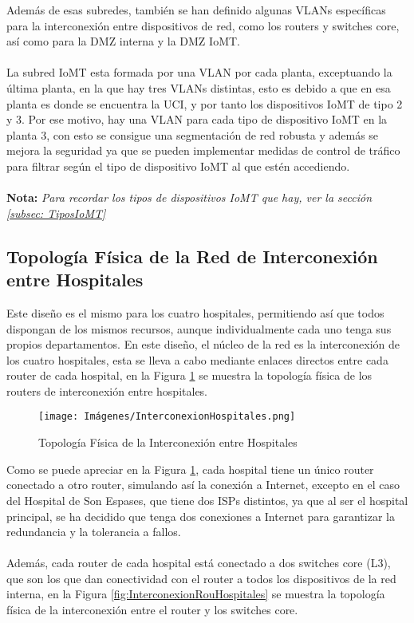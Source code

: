 Además de esas subredes, también se han definido algunas VLANs específicas para la interconexión entre dispositivos de red, como los routers y switches core, así como para la DMZ interna y la DMZ IoMT.
\\ \\
La subred IoMT esta formada por una VLAN por cada planta, exceptuando la última planta, en la que hay tres VLANs distintas, esto es debido a que en esa planta es donde se encuentra la UCI, y por tanto los dispositivos IoMT de tipo 2 y 3.
Por ese motivo, hay una VLAN para cada tipo de dispositivo IoMT en la planta 3, con esto se consigue una segmentación de red robusta y además se mejora la seguridad ya que se pueden implementar medidas de control de tráfico para filtrar según el tipo de dispositivo IoMT al que estén accediendo.
\\ \\
{\small \textbf{Nota:} \textit{Para recordar los tipos de dispositivos IoMT que hay, ver la sección \ref{subsec: TiposIoMT}}}


\subsection{Topología Física de la Red de Interconexión entre Hospitales}
Este diseño es el mismo para los cuatro hospitales, permitiendo así que todos dispongan de los mismos recursos, aunque individualmente cada uno tenga sus propios departamentos.
En este diseño, el núcleo de la red es la interconexión de los cuatro hospitales, esta se lleva a cabo mediante enlaces directos entre cada router de cada hospital, en la Figura \ref{fig:InterconexionHospitales}
se muestra la topología física de los routers de interconexión entre hospitales.

\begin{figure}[H]
    \centering
    \texttt{[image: Imágenes/InterconexionHospitales.png]}
    \caption{Topología Física de la Interconexión entre Hospitales}
    \label{fig:InterconexionHospitales}
\end{figure}

Como se puede apreciar en la Figura \ref{fig:InterconexionHospitales}, cada hospital tiene un único router conectado a otro router, simulando así la conexión a Internet, excepto en el caso del Hospital de Son Espases, que 
tiene dos ISPs distintos, ya que al ser el hospital principal, se ha decidido que tenga dos conexiones a Internet para garantizar la redundancia y la tolerancia a fallos.
\\ \\
Además, cada router de cada hospital está conectado a dos switches core (L3), que son los que dan conectividad con el router a todos los dispositivos de la red interna, en la Figura 
\ref{fig:InterconexionRouHospitales} se muestra la topología física de la interconexión entre el router y los switches core. 

